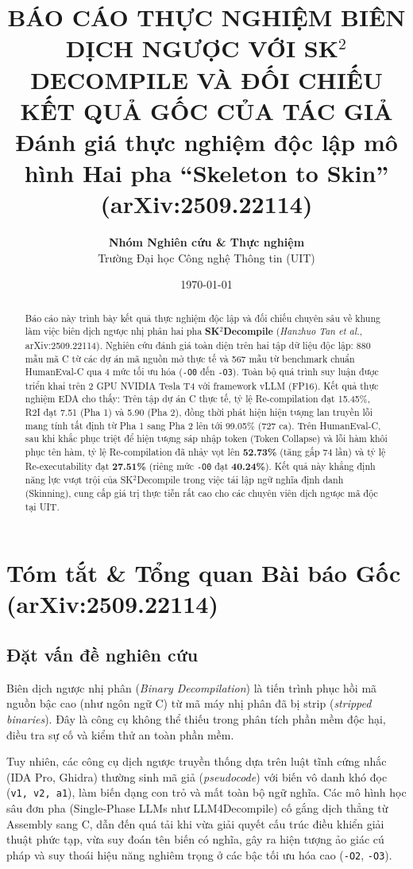 \documentclass[11pt,a4paper]{article}
\title{\textbf{\Large BÁO CÁO THỰC NGHIỆM BIÊN DỊCH NGƯỢC VỚI SK$^2$DECOMPILE VÀ ĐỐI CHIẾU KẾT QUẢ GỐC CỦA TÁC GIẢ}\\[0.5em]
\large Đánh giá thực nghiệm độc lập mô hình Hai pha ``Skeleton to Skin'' (arXiv:2509.22114)}
\author{\textbf{Nhóm Nghiên cứu \& Thực nghiệm}\\Trường Đại học Công nghệ Thông tin (UIT)}
\date{\today}
\begin{document}
\maketitle

\begin{abstract}
Báo cáo này trình bày kết quả thực nghiệm độc lập và đối chiếu chuyên sâu về khung làm việc biên dịch ngược nhị phân hai pha \textbf{SK$^2$Decompile} (\textit{Hanzhuo Tan et al.}, arXiv:2509.22114). Nghiên cứu đánh giá toàn diện trên hai tập dữ liệu độc lập: 880 mẫu mã C từ các dự án mã nguồn mở thực tế và 567 mẫu từ benchmark chuẩn HumanEval-C qua 4 mức tối ưu hóa (\texttt{-O0} đến \texttt{-O3}). Toàn bộ quá trình suy luận được triển khai trên 2 GPU NVIDIA Tesla T4 với framework vLLM (FP16). Kết quả thực nghiệm EDA cho thấy: Trên tập dự án C thực tế, tỷ lệ Re-compilation đạt 15.45\%, R2I đạt 7.51 (Pha 1) và 5.90 (Pha 2), đồng thời phát hiện hiện tượng lan truyền lỗi mang tính tất định từ Pha 1 sang Pha 2 lên tới 99.05\% (727 ca). Trên HumanEval-C, sau khi khắc phục triệt để hiện tượng sáp nhập token (Token Collapse) và lỗi hàm khôi phục tên hàm, tỷ lệ Re-compilation đã nhảy vọt lên \textbf{52.73\%} (tăng gấp 74 lần) và tỷ lệ Re-executability đạt \textbf{27.51\%} (riêng mức \texttt{-O0} đạt \textbf{40.24\%}). Kết quả này khẳng định năng lực vượt trội của SK$^2$Decompile trong việc tái lập ngữ nghĩa định danh (Skinning), cung cấp giá trị thực tiễn rất cao cho các chuyên viên dịch ngược mã độc tại UIT.
\end{abstract}

\tableofcontents
\newpage

\section{Tóm tắt \& Tổng quan Bài báo Gốc (arXiv:2509.22114)}

\subsection{Đặt vấn đề nghiên cứu}
Biên dịch ngược nhị phân (\textit{Binary Decompilation}) là tiến trình phục hồi mã nguồn bậc cao (như ngôn ngữ C) từ mã máy nhị phân đã bị strip (\textit{stripped binaries}). Đây là công cụ không thể thiếu trong phân tích phần mềm độc hại, điều tra sự cố và kiểm thử an toàn phần mềm.

Tuy nhiên, các công cụ dịch ngược truyền thống dựa trên luật tĩnh cứng nhắc (IDA Pro, Ghidra) thường sinh mã giả (\textit{pseudocode}) với biến vô danh khó đọc (\texttt{v1, v2, a1}), làm biến dạng con trỏ và mất toàn bộ ngữ nghĩa. Các mô hình học sâu đơn pha (Single-Phase LLMs như LLM4Decompile) cố gắng dịch thẳng từ Assembly sang C, dẫn đến quá tải khi vừa giải quyết cấu trúc điều khiển giải thuật phức tạp, vừa suy đoán tên biến có nghĩa, gây ra hiện tượng ảo giác cú pháp và suy thoái hiệu năng nghiêm trọng ở các bậc tối ưu hóa cao (\texttt{-O2}, \texttt{-O3}).
\end{document}

